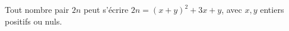 Tout nombre pair $2n$ peut s'écrire $2n = (x + y)^2 + 3x + y$, avec $x, y$ entiers positifs ou nuls.
